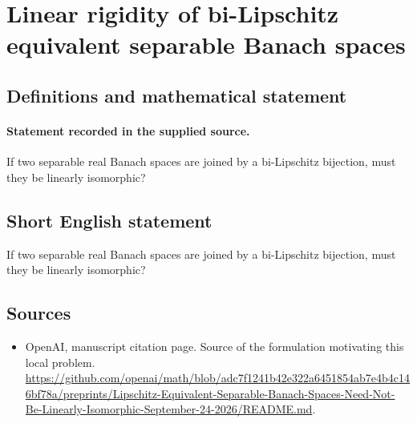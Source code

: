 \documentclass[11pt]{article}
\begin{document}
\section*{Linear rigidity of bi-Lipschitz equivalent separable Banach spaces}\label{statement}
\subsection{Definitions and mathematical statement}
\paragraph{Statement recorded in the supplied source.}
If two separable real Banach spaces are joined by a bi-Lipschitz bijection, must they be linearly isomorphic?
\subsection{Short English statement}
If two separable real Banach spaces are joined by a bi-Lipschitz bijection, must they be linearly isomorphic?
\subsection{Sources}
\begin{itemize}
\item[S1] OpenAI, manuscript citation page. Source of the formulation motivating this local problem.
\url{https://github.com/openai/math/blob/adc7f1241b42e322a6451854ab7e4b4c146bf78a/preprints/Lipschitz-Equivalent-Separable-Banach-Spaces-Need-Not-Be-Linearly-Isomorphic-September-24-2026/README.md}.
\end{itemize}
\end{document}
